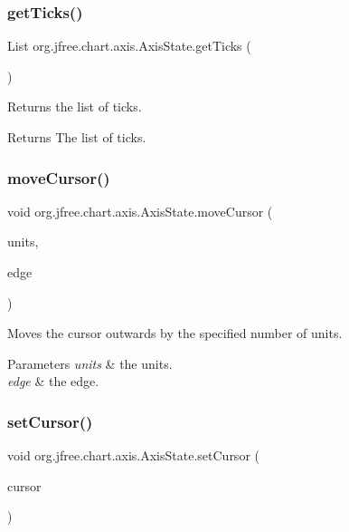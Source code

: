 \subsubsection{\texorpdfstring{get\+Ticks()}{getTicks()}}
{\footnotesize\ttfamily List org.\+jfree.\+chart.\+axis.\+Axis\+State.\+get\+Ticks (\begin{DoxyParamCaption}{ }\end{DoxyParamCaption})}

Returns the list of ticks.

\begin{DoxyReturn}{Returns}
The list of ticks. 
\end{DoxyReturn}
\mbox{\label{classorg_1_1jfree_1_1chart_1_1axis_1_1_axis_state_ad387081c8a498a4c9d902583b7b5a78e}} 
\subsubsection{\texorpdfstring{move\+Cursor()}{moveCursor()}}
{\footnotesize\ttfamily void org.\+jfree.\+chart.\+axis.\+Axis\+State.\+move\+Cursor (\begin{DoxyParamCaption}\item[{double}]{units,  }\item[{Rectangle\+Edge}]{edge }\end{DoxyParamCaption})}

Moves the cursor outwards by the specified number of units.


\begin{DoxyParams}{Parameters}
{\em units} & the units. \\
\hline
{\em edge} & the edge. \\
\hline
\end{DoxyParams}
\mbox{\label{classorg_1_1jfree_1_1chart_1_1axis_1_1_axis_state_af1d224e02daffe44cdcff3fd523eae1a}} 
\subsubsection{\texorpdfstring{set\+Cursor()}{setCursor()}}
{\footnotesize\ttfamily void org.\+jfree.\+chart.\+axis.\+Axis\+State.\+set\+Cursor (\begin{DoxyParamCaption}\item[{double}]{cursor }\end{DoxyParamCaption})}


